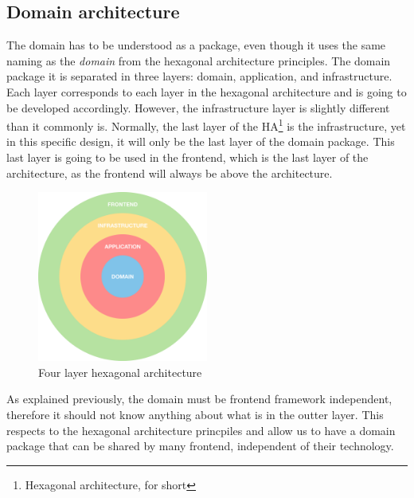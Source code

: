\documentclass[../design.tex]{subfiles}
\begin{document}
\subsection{Domain architecture}
The domain has to be understood as a package, even though it uses the same
naming as the \emph{domain} from the hexagonal architecture principles. The
domain package it is separated in three layers: domain, application, and
infrastructure. Each layer corresponds to each layer in the hexagonal
architecture and is going to be developed accordingly. However, the
infrastructure layer is slightly different than it commonly is. Normally, the
last layer of the HA\footnote{Hexagonal architecture, for short} is the
infrastructure, yet in this specific design, it will only be the last layer of
the domain package. This last layer is going to be used in the frontend, which
is the last layer of the architecture, as the frontend will always be above the
architecture.
\begin{figure}[H]
	\centering
	\includegraphics[width=0.5\textwidth]{./assets/ha.png}
	\caption{Four layer hexagonal architecture}
\end{figure}
As explained previously, the domain must be frontend framework independent,
therefore it should not know anything about what is in the outter layer. This
respects to the hexagonal architecture princpiles and allow us to have a domain
package that can be shared by many frontend, independent of their technology.
\end{document}
